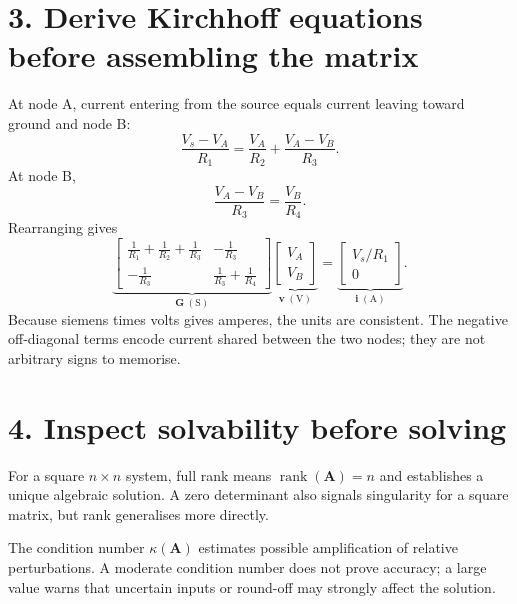 \documentclass[11pt,a4paper]{article}
\begin{document}
\section*{3. Derive Kirchhoff equations before assembling the matrix}
At node A, current entering from the source equals current leaving toward ground and node B:
\begin{equation}
  \frac{V_s-V_A}{R_1}=\frac{V_A}{R_2}+\frac{V_A-V_B}{R_3}.
\end{equation}
At node B,
\begin{equation}
  \frac{V_A-V_B}{R_3}=\frac{V_B}{R_4}.
\end{equation}
Rearranging gives
\begin{equation}
\underbrace{\begin{bmatrix}
\frac1{R_1}+\frac1{R_2}+\frac1{R_3} & -\frac1{R_3}\\[2mm]
-\frac1{R_3} & \frac1{R_3}+\frac1{R_4}
\end{bmatrix}}_{\mathbf{G}\;(\mathrm{S})}
\underbrace{\begin{bmatrix}V_A\\V_B\end{bmatrix}}_{\mathbf{v}\;(\mathrm{V})}
=
\underbrace{\begin{bmatrix}V_s/R_1\\0\end{bmatrix}}_{\mathbf{i}\;(\mathrm{A})}.
\end{equation}
Because siemens times volts gives amperes, the units are consistent. The negative off-diagonal terms encode current shared between the two nodes; they are not arbitrary signs to memorise.

\section*{4. Inspect solvability before solving}
For a square $n\times n$ system, full rank means $\operatorname{rank}(\mathbf{A})=n$ and establishes a unique algebraic solution. A zero determinant also signals singularity for a square matrix, but rank generalises more directly.

The condition number $\kappa(\mathbf{A})$ estimates possible amplification of relative perturbations. A moderate condition number does not prove accuracy; a large value warns that uncertain inputs or round-off may strongly affect the solution.
\end{document}
